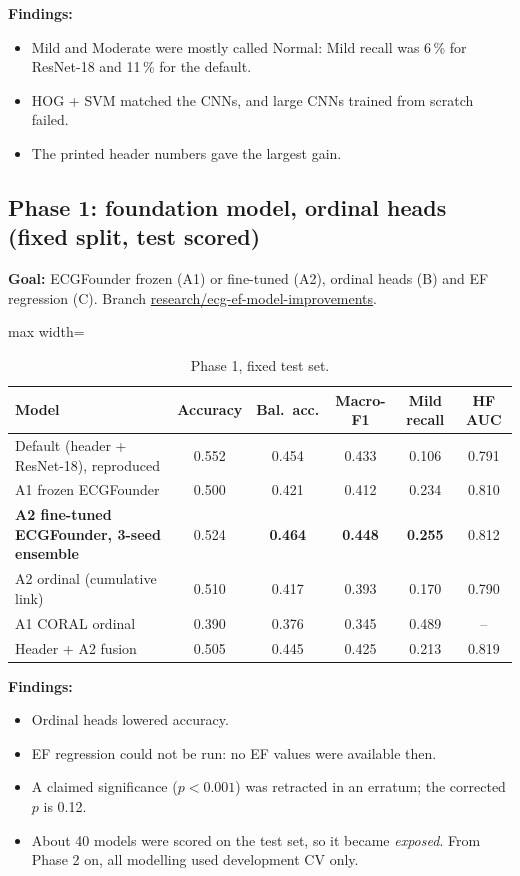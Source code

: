 \textbf{Findings:}
\begin{itemize}
  \item Mild and Moderate were mostly called Normal: Mild recall was 6\,\% for ResNet-18 and 11\,\% for the default.
  \item HOG + SVM matched the CNNs, and large CNNs trained from scratch failed.
  \item The printed header numbers gave the largest gain.
\end{itemize}

\subsection{Phase 1: foundation model, ordinal heads (fixed split, test scored)}
\textbf{Goal:} ECGFounder frozen (A1) or fine-tuned (A2), ordinal heads (B) and EF regression (C). Branch
\url{research/ecg-ef-model-improvements}.
\begin{table}[H]\centering\small
\caption{Phase 1, fixed test set.}\label{tab:p1}
\begin{adjustbox}{max width=\linewidth}
\begin{tabular}{lccccc}\toprule
Model & Accuracy & Bal.\ acc. & Macro-F1 & Mild recall & HF AUC \\\midrule
Default (header + ResNet-18), reproduced & 0.552 & 0.454 & 0.433 & 0.106 & 0.791 \\
A1 frozen ECGFounder & 0.500 & 0.421 & 0.412 & 0.234 & 0.810 \\
\textbf{A2 fine-tuned ECGFounder, 3-seed ensemble} & 0.524 & \textbf{0.464} & \textbf{0.448} & \textbf{0.255} & 0.812 \\
A2 ordinal (cumulative link) & 0.510 & 0.417 & 0.393 & 0.170 & 0.790 \\
A1 CORAL ordinal & 0.390 & 0.376 & 0.345 & 0.489 & -- \\
Header + A2 fusion & 0.505 & 0.445 & 0.425 & 0.213 & 0.819 \\\bottomrule
\end{tabular}
\end{adjustbox}
\end{table}
\textbf{Findings:}
\begin{itemize}
  \item Ordinal heads lowered accuracy.
  \item EF regression could not be run: no EF values were available then.
  \item A claimed significance ($p<0.001$) was retracted in an erratum; the corrected $p$ is 0.12.
  \item About 40 models were scored on the test set, so it became \emph{exposed}. From Phase 2 on, all modelling
    used development CV only.
\end{itemize}

